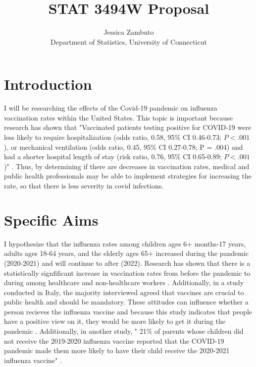 \documentclass[12pt]{article}
\title{STAT 3494W Proposal}
\author{Jessica Zambuto\\
Department of Statistics, University of Connecticut}
\begin{document}
\maketitle

\section*{Introduction}
\label{sec:intro}
I will be researching the effects of the Covid-19 pandemic on influenza vaccination rates within the United States. This topic
is important because research has shown that "Vaccinated patients testing positive for COVID-19 were less likely to require hospitalization 
(odds ratio, 0.58, 95\% CI 0.46-0.73; $P< .001$), or mechanical ventilation (odds ratio, 0.45, 95\% CI 0.27-0.78; P = .004) and had a shorter 
hospital length of stay (risk ratio, 0.76, 95\% CI 0.65-0.89; $P< .001$)" \citep{conlon2021impact}. Thus, by determining if there are decreases
in vaccination rates, medical and public health professionals may be able to implement strategies for increasing the rate, so that there is less 
severity in covid infections.  

\section*{Specific Aims}
\label{sec:aims}
I hypothesize that the influenza rates among children ages 6+ months-17 years, adults ages 18-64 years, and the elderly ages 65+ increased during 
the pandemic (2020-2021) and will continue to after (2022). Research has shown that there is a statistically signfificant increase in vaccination 
rates from before the pandemic to during among healthcare and non-healthcare workers \citep{conlon2021impact}. Additionally, in a study conducted 
in Italy, the majority interviewed agreed that vaccines are crucial to public health and should be mandatory. These attitudes can influence whether
a person recieves the influenza vaccine and because this study indicates that people have a positive view on it, they would be more likely to 
get it during the pandemic \citep{domnich2020attitudes}. Additionally, in another study, " 21\% of parents whose children did not receive the 2019-2020 
influenza vaccine reported that the COVID-19 pandemic made them more likely to have their child receive the 2020-2021 influenza vaccine" \citep{sokol2020covid}.
\end{document}

